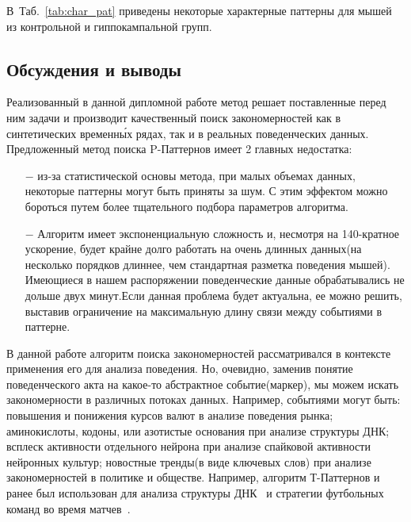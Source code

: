 \documentclass[12pt,fсeqn]{article}
\begin{document}
В~Таб.~\ref{tab:char_pat} приведены некоторые характерные паттерны для мышей из контрольной и гиппокампальной групп.


\subsection{Обсуждения и выводы}
Реализованный в данной дипломной работе метод решает поставленные перед ним задачи и производит 
качественный поиск закономерностей как в синтетических временн\'{ы}х рядах, так и в реальных
поведенческих данных. 
Предложенный метод поиска P-Паттернов имеет 2 главных недостатка:
\begin{itemize}
\item[$-$]
из-за статистической основы метода, при малых объемах данных, некоторые паттерны могут быть приняты за шум. С этим эффектом
можно бороться путем более тщательного подбора параметров алгоритма. 
\item[$-$]
Алгоритм имеет экспоненциальную сложность и, несмотря на 140-кратное ускорение, будет
крайне долго работать на очень длинных данных(на несколько порядков длиннее, чем стандартная разметка поведения мышей). 
Имеющиеся в нашем распоряжении поведенческие данные обрабатывались не дольше двух минут.Если данная проблема 
будет актуальна, ее можно решить, выставив ограничение на максимальную длину связи между событиями в паттерне.
\end{itemize}

В данной работе алгоритм поиска закономерностей рассматривался в контексте применения его для анализа поведения.
Но, очевидно, заменив понятие поведенческого акта на какое-то абстрактное событие(маркер), мы можем 
искать закономерности в различных потоках данных. Например, событиями могут быть:
повышения и понижения курсов валют в анализе поведения рынка;
аминокислоты, кодоны, или азотистые основания при анализе структуры ДНК;
всплеск активности отдельного нейрона при анализе спайковой активности нейронных культур;
новостные тренды(в виде ключевых слов) при анализе закономерностей в политике и обществе.
Например, алгоритм Т-Паттернов и ранее был использован для анализа структуры 
ДНК~\cite{TP_DNA} и стратегии футбольных команд во время матчев~\cite{TP_FOOTBALL}.
\end{document}
